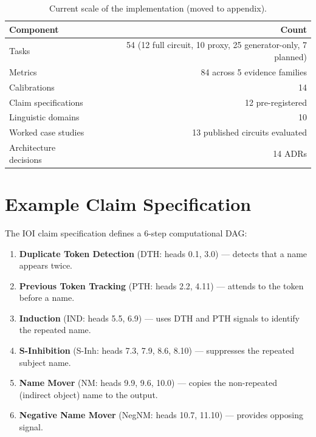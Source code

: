 \documentclass[10pt]{article}
\begin{document}
\begin{table}[p]
\centering
\small
\caption{Current scale of the implementation (moved to appendix).}
\label{tab:scale_app}
\renewcommand{\arraystretch}{1.12}
\begin{tabular}{|l|r|}
\hline
\textbf{Component} & \textbf{Count} \\
\hline
Tasks & 54 (12 full circuit, 10 proxy, 25 generator-only, 7 planned) \\
\hline
Metrics & 84 across 5 evidence families \\
\hline
Calibrations & 14 \\
\hline
Claim specifications & 12 pre-registered \\
\hline
Linguistic domains & 10 \\
\hline
Worked case studies & 13 published circuits evaluated \\
\hline
Architecture decisions & 14 ADRs \\
\hline
\end{tabular}
\end{table}

\appendix

\section{Example Claim Specification}
\label{app:ioi-spec}

The IOI claim specification defines a 6-step computational DAG:

\begin{enumerate}[nosep]
    \item \textbf{Duplicate Token Detection} (DTH: heads 0.1, 3.0) --- detects that a name appears twice.
    \item \textbf{Previous Token Tracking} (PTH: heads 2.2, 4.11) --- attends to the token before a name.
    \item \textbf{Induction} (IND: heads 5.5, 6.9) --- uses DTH and PTH signals to identify the repeated name.
    \item \textbf{S-Inhibition} (S-Inh: heads 7.3, 7.9, 8.6, 8.10) --- suppresses the repeated subject name.
    \item \textbf{Name Mover} (NM: heads 9.9, 9.6, 10.0) --- copies the non-repeated (indirect object) name to the output.
    \item \textbf{Negative Name Mover} (NegNM: heads 10.7, 11.10) --- provides opposing signal.
\end{enumerate}
\end{document}
